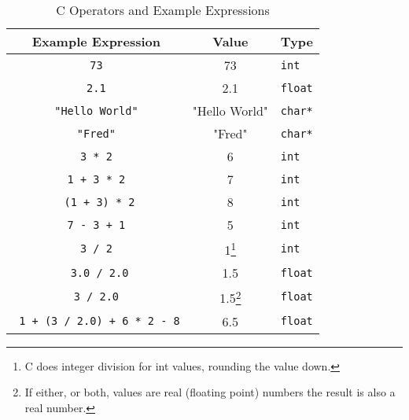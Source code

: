 \begin{table}[h]
  \begin{minipage}{\textwidth}
  \centering
  \begin{tabular}{|c|c|l|}
    \hline
    \textbf{Example Expression} & \textbf{Value} & \textbf{Type} \\
    \hline
    \texttt{ 73 }     &   73                 & \texttt{int}  \\
    \texttt{ 2.1 }      & 2.1   & \texttt{float}    \\
    \texttt{ "Hello World" }      &   "Hello World"    & \texttt{char*}   \\
    \texttt{ "Fred" }      &   "Fred"    & \texttt{char*}   \\
    \texttt{ 3 * 2 } & 6 & \texttt{int} \\
    \texttt{ 1 + 3 * 2 }  & 7 & \texttt{int} \\
    \texttt{ (1 + 3) * 2} & 8 & \texttt{int} \\
    \texttt{ 7 - 3 + 1 }  & 5 & \texttt{int} \\
    \texttt{ 3 / 2 } & 1\footnote{C does integer division for int values, rounding the value down.} & \texttt{int} \\
    \texttt{ 3.0 / 2.0} & 1.5 & \texttt{float} \\
    \texttt{ 3 / 2.0 } & 1.5\footnote{If either, or both, values are real (floating point) numbers the result is also a real number.} & \texttt{float} \\
    \texttt{ 1 + (3 / 2.0) + 6 * 2 - 8} & 6.5 & \texttt{float} \\
    \hline
  \end{tabular}
\end{minipage}
  \caption{C Operators and Example Expressions}
  \label{tbl:program-creation-c example expresions}
\end{table}




